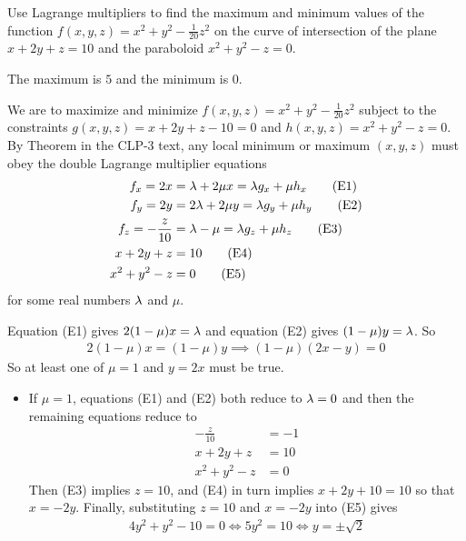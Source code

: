 \begin{question}[M200 2009A] %
Use Lagrange multipliers to find the maximum and minimum values of the 
function $f(x,y,z) = x^2 + y^2 -\frac{1}{20} z^2$ on the curve of 
intersection of the plane $x + 2y + z = 10$ and the paraboloid 
$x^2 + y^2 - z = 0$.
\end{question}

%

\begin{answer}
The maximum is $5$ and the minimum is $0$.
\end{answer}

\begin{solution}
We are to maximize and minimize $f(x,y,z)=x^2 + y^2 -\frac{1}{20} z^2$ 
subject to the constraints $g(x,y,z)=x + 2y + z - 10=0$ and 
$h(x,y,z) = x^2 + y^2 - z=0$.
By Theorem  in the CLP-3 text, 
any local minimum or maximum $(x,y,z)$ must obey the  double Lagrange 
multiplier equations
\begin{align*}
f_x = 2x &=\lambda + 2 \mu x = \lambda g_x +\mu h_x\tag{E1} \\ 
f_y = 2y &=2\lambda + 2 \mu y = \lambda g_y +\mu h_y\tag{E2} \\ 
f_z = -\frac{z}{10} &=\lambda - \mu  = \lambda g_z +\mu h_z\tag{E3} \\ 
x + 2y + z &= 10\tag{E4} \\
x^2 + y^2 - z &= 0 \tag{E5}
\end{align*}
for some real numbers $\lambda$ and $\mu$.

Equation (E1) gives $2(1-\mu)x=\lambda$ and equation (E2) gives
$(1-\mu)y=\lambda$. So
\begin{align*}
2(1-\mu)x=(1-\mu)y
\implies 
(1-\mu)(2x-y)=0
\end{align*}
So at least one of $\mu=1$ and $y=2x$ must be true.
\begin{itemize}
\item 
If $\mu=1$, equations (E1) and (E2) both reduce to $\lambda=0$
and then the remaining equations reduce to
\begin{align*}
-\frac{z}{10} &=-1\tag{E3} \\ 
x + 2y + z &= 10\tag{E4} \\
x^2 + y^2 - z &= 0 \tag{E5}
\end{align*}
Then (E3) implies $z=10$, and (E4) in turn implies $x+2y+10=10$ so
that $x=-2y$. Finally, substituting $z=10$ and $x=-2y$ into (E5) gives 
\begin{align*}
4y^2+y^2-10=0
\iff 5y^2=10
\iff y=\pm\sqrt{2}
\end{align*}



\end{itemize}
\end{solution}
